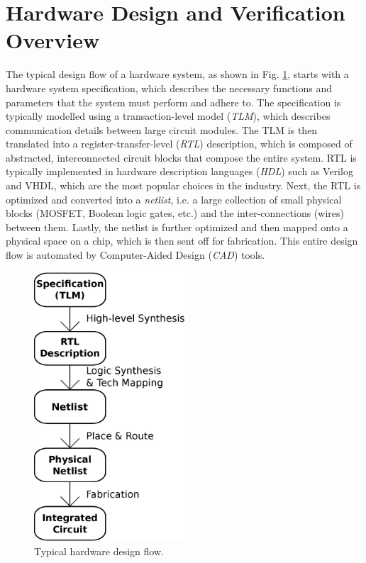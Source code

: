 \section{Hardware Design and Verification Overview}
The typical design flow of a hardware system, 
as shown in Fig. \ref{fig:cadflow}, starts with a hardware system 
specification, which describes the necessary functions and parameters that 
the system must perform and adhere to. The specification is typically
modelled using a transaction-level model (\emph{TLM}), which describes 
communication details between large circuit modules. 
The TLM is then translated 
into a register-transfer-level (\emph{RTL}) description, which is composed of abstracted, 
interconnected circuit blocks that compose the entire system. RTL is 
typically implemented 
in hardware description languages (\emph{HDL}) such as Verilog and VHDL, 
which are the most popular choices in the industry.
Next, the RTL is optimized and converted into a \emph{netlist}, i.e. a large 
collection of small physical blocks (MOSFET, Boolean logic gates, etc.) and 
the inter-connections (wires) between them. 
Lastly, the netlist is further optimized and then mapped onto a physical space 
on a chip, which is then sent off for fabrication. This entire design flow
is automated by Computer-Aided Design (\emph{CAD}) tools. 

{
\begin{figure}[h]
\centerline{
\includegraphics[width=0.5\textwidth]{./figures/designFlow}
}
\caption{Typical hardware design flow.}
\label{fig:cadflow}
\end{figure}
}

